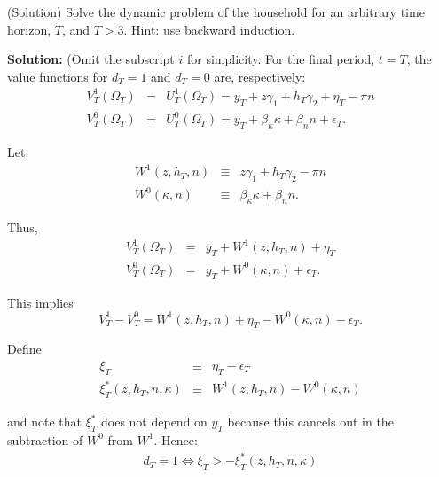 \begin{exercise} (Solution)
Solve the dynamic problem of the household for an arbitrary time horizon, $T$, and $T>3$. Hint: use backward induction.
\end{exercise}

\noindent\textbf{Solution:}
\noindent (Omit the subscript $i$ for simplicity. For the final period, $t = T$, the value functions for $d_{T}=1$ and $d_{T}=0$ are, respectively:\\
\begin{eqnarray}
V^{1}_{T}\left(\Omega_{T}\right) &=& U^{1}_{T}\left(\Omega_{T}\right) = y_{T} + z\gamma_1 + h_{T}\gamma_2 + \eta_{T} - \pi n \label{eq:valueFun1_T} \\
V^{0}_{T}\left(\Omega_{T}\right) &=& U^{0}_{T}\left(\Omega_{T}\right) = y_{T} + \beta_\kappa \kappa + \beta_n n + \epsilon_T \label{eq:valueFun2_T}.
\end{eqnarray}

\indent Let:
\begin{eqnarray}
W^1 \left(z,h_T,n\right) & \equiv & z \gamma_1 + h_T \gamma_2 - \pi n\\
W^0 \left(\kappa,n\right) & \equiv & \beta_\kappa \kappa + \beta_n n.
\end{eqnarray}

\indent Thus, 
\begin{eqnarray}
V_T^1\left(\Omega_T\right) &=& y_T + W^1\left(z,h_T,n\right) + \eta_T \\
V_T^0\left(\Omega_T\right) &=& y_T + W^0\left(\kappa,n\right) + \epsilon_T.
\end{eqnarray}

\indent This implies
\begin{equation}
V^1_T - V^0_T =  W^1\left(z,h_T,n\right) + \eta_T -   W^0\left(\kappa,n\right) - \epsilon_T.
\end{equation}

\indent Define
\begin{eqnarray}
\xi_T & \equiv & \eta_T - \epsilon_T \\
\xi^{*}_T\left(z,h_T,n,\kappa\right) & \equiv & W^1\left(z,h_T,n\right) - W^0\left(\kappa,n\right) \label{eq:policyFun1_T}
\end{eqnarray}

\noindent and note that $\xi_T^*$ does not depend on $y_T$ because this cancels out in the subtraction of $W^0$ from $W^1$. Hence:
\begin{eqnarray}
d_T=1 \iff \xi_T > -\xi^{*}_T\left(z,h_T,n,\kappa\right) \label{eq:policyFun2_T}
\end{eqnarray}

